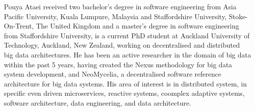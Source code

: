 \documentclass{ieeeaccess}
\begin{document}
\begin{IEEEbiography}{Pouya Ataei} received two bachelor's degree in software engineering from Asia Pacific University, Kuala Lumpure, Malaysia and Staffordshire University, Stoke-On-Trent, The United Kingdom and a master's degree in software engineering from Staffordshire University, is a current PhD student at Auckland University of Technology, Auckland, New Zealand, working on decentralised and distributed big data architectures. He has been an active researcher in the domain of big data within the past 5 years, having created the Nexus methodology for big data system development, and NeoMycelia, a decentralised software reference architecture for big data systems. His area of interest is in distributed system, in specific even driven microservices, reactive systems, coomplex adaptive systems, software architecture, data engineering, and data architecture. \end{IEEEbiography}

 

\EOD
\end{document}
